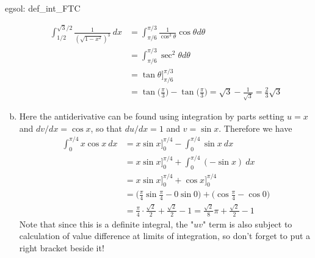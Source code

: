 \begin{egsol}[]{egsol: def_int_FTC}
\begin{enumerate}[a)]
        \begin{align*}
            \int_{1/2}^{\sqrt{3}/2} \frac{1}{(\sqrt{1-x^2})^3}~dx &= \int_{\pi/6}^{\pi/3} \frac{1}{\cos^3 \theta}\cos \theta d\theta\\
            &= \int_{\pi/6}^{\pi/3} \sec^2 \theta d\theta\\
            &= \tan \theta \Big]_{\pi/6}^{\pi/3}\\
            &= \tan\Big(\frac{\pi}{3}\Big) - \tan\Big(\frac{\pi}{3}\Big) = \sqrt{3} - \frac{1}{\sqrt{3}} = \frac{2}{3}\sqrt{3}
        \end{align*}
        \item Here the antiderivative can be found using integration by parts setting $u = x$ and $dv/dx = \cos x$, so that $du/dx = 1$ and $v = \sin x$.  Therefore we have
        \begin{align*}
            \int_{0}^{\pi/4} x \cos x~dx &= x \sin x \Big]_{0}^{\pi/4} - \int_{0}^{\pi/4} \sin x~dx\\
            &= x \sin x \Big]_{0}^{\pi/4} + \int_{0}^{\pi/4} (-\sin x)~dx\\
            &= x \sin x \Big]_{0}^{\pi/4} + \cos x \Big]_{0}^{\pi/4}\\
            &= \Big(\frac{\pi}{4} \sin \frac{\pi}{4} - 0 \sin 0\Big) + \Big(\cos \frac{\pi}{4} - \cos 0 \Big)\\
            &= \frac{\pi}{4} \cdot \frac{\sqrt{2}}{2} + \frac{\sqrt{2}}{2} - 1 = \frac{\sqrt{2}}{8}\pi + \frac{\sqrt{2}}{2}- 1
        \end{align*}
        Note that since this is a definite integral, the "$uv$" term is also subject to calculation of value difference at limits of integration, so don't forget to put a right bracket beside it!
    \end{enumerate}
\end{egsol}